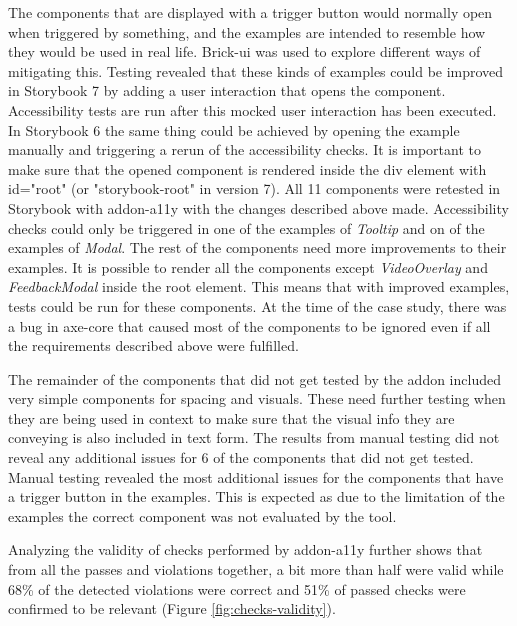 \documentclass{master_thesis}
\begin{document}
The components that are displayed with a trigger button would normally open when triggered by something, and the examples are intended to resemble how they would be used in real life. Brick-ui was used to explore different ways of mitigating this. Testing revealed that these kinds of examples could be improved in Storybook 7 by adding a user interaction that opens the component. Accessibility tests are run after this mocked user interaction has been executed. In Storybook 6 the same thing could be achieved by opening the example manually and triggering a rerun of the accessibility checks. It is important to make sure that the opened component is rendered inside the div element with id="root" (or "storybook-root" in version 7). All 11 components were retested in Storybook with addon-a11y with the changes described above made. Accessibility checks could only be triggered in one of the examples of \textit{Tooltip} and on of the examples of \textit{Modal}. The rest of the components need more improvements to their examples. It is possible to render all the components except \textit{VideoOverlay} and \textit{FeedbackModal} inside the root element. This means that with improved examples, tests could be run for these components. At the time of the case study, there was a bug in axe-core that caused most of the components to be ignored even if all the requirements described above were fulfilled.

The remainder of the components that did not get tested by the addon included very simple components for spacing and visuals. These need further testing when they are being used in context to make sure that the visual info they are conveying is also included in text form. The results from manual testing did not reveal any additional issues for 6 of the components that did not get tested. Manual testing revealed the most additional issues for the components that have a trigger button in the examples. This is expected as due to the limitation of the examples the correct component was not evaluated by the tool.

Analyzing the validity of checks performed by addon-a11y further shows that from all the passes and violations together, a bit more than half were valid while 68\% of the detected violations were correct and 51\% of passed checks were confirmed to be relevant (Figure \ref{fig:checks-validity}).
\end{document}

